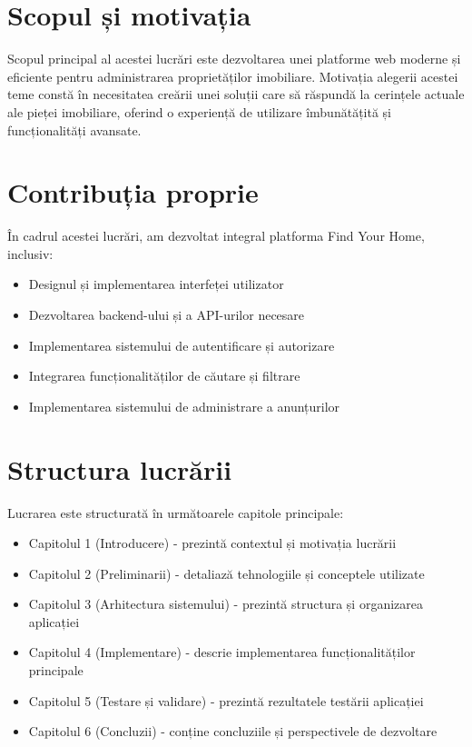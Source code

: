 \documentclass[12pt,a4paper]{report}
\begin{document}
\section{Scopul și motivația}
Scopul principal al acestei lucrări este dezvoltarea unei platforme web moderne și eficiente pentru administrarea proprietăților imobiliare. Motivația alegerii acestei teme constă în necesitatea creării unei soluții care să răspundă la cerințele actuale ale pieței imobiliare, oferind o experiență de utilizare îmbunătățită și funcționalități avansate.

\section{Contribuția proprie}
În cadrul acestei lucrări, am dezvoltat integral platforma Find Your Home, inclusiv:
\begin{itemize}
    \item Designul și implementarea interfeței utilizator
    \item Dezvoltarea backend-ului și a API-urilor necesare
    \item Implementarea sistemului de autentificare și autorizare
    \item Integrarea funcționalităților de căutare și filtrare
    \item Implementarea sistemului de administrare a anunțurilor
\end{itemize}

\section{Structura lucrării}
Lucrarea este structurată în următoarele capitole principale:
\begin{itemize}
    \item Capitolul 1 (Introducere) - prezintă contextul și motivația lucrării
    \item Capitolul 2 (Preliminarii) - detaliază tehnologiile și conceptele utilizate
    \item Capitolul 3 (Arhitectura sistemului) - prezintă structura și organizarea aplicației
    \item Capitolul 4 (Implementare) - descrie implementarea funcționalităților principale
    \item Capitolul 5 (Testare și validare) - prezintă rezultatele testării aplicației
    \item Capitolul 6 (Concluzii) - conține concluziile și perspectivele de dezvoltare
\end{itemize}
\end{document}
